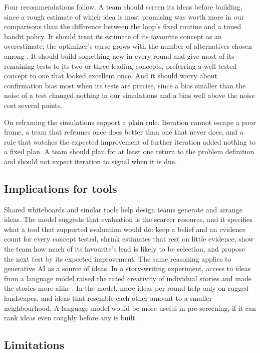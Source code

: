 \documentclass[10pt,twocolumn]{article}
\theoremstyle{definition}
\begin{document}
Four recommendations follow. A team should screen its ideas before building, since a rough estimate of which idea is most promising was worth more in our comparisons than the difference between the loop's fixed routine and a tuned bandit policy. It should treat its estimate of its favourite concept as an overestimate; the optimizer's curse grows with the number of alternatives chosen among \citep{smithwinkler2006}. It should build something new in every round and give most of its remaining tests to its two or three leading concepts, preferring a well-tested concept to one that looked excellent once. And it should worry about confirmation bias most when its tests are precise, since a bias smaller than the noise of a test changed nothing in our simulations and a bias well above the noise cost several points.

On reframing the simulations support a plain rule. Iteration cannot escape a poor frame, a team that reframes once does better than one that never does, and a rule that watches the expected improvement of further iteration added nothing to a fixed plan. A team should plan for at least one return to the problem definition and should not expect iteration to signal when it is due.

\subsection{Implications for tools}

Shared whiteboards and similar tools help design teams generate and arrange ideas. The model suggests that evaluation is the scarcer resource, and it specifies what a tool that supported evaluation would do: keep a belief and an evidence count for every concept tested, shrink estimates that rest on little evidence, show the team how much of its favourite's lead is likely to be selection, and propose the next test by its expected improvement. The same reasoning applies to generative AI as a source of ideas. In a story-writing experiment, access to ideas from a language model raised the rated creativity of individual stories and made the stories more alike \citep{doshi2024}. In the model, more ideas per round help only on rugged landscapes, and ideas that resemble each other amount to a smaller neighbourhood. A language model would be more useful in pre-screening, if it can rank ideas even roughly before any is built.

\subsection{Limitations}
\end{document}
